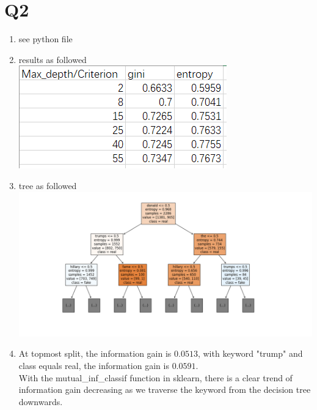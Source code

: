 \documentclass[12pt]{article}
\begin{document}
	
	\section*{Q2}
	\begin{enumerate}[label=\alph*)]
		\item see python file
		\item results as followed\\ \includegraphics[scale=0.7]{q2b}
		\item tree as followed\\ \includegraphics[scale=0.5]{q2c}
		\item At topmost split, the information gain is $0.0513$, with keyword "trump" and class equals real, the information gain is $0.0591$.\\
		With the mutual\_inf\_classif function in sklearn, there is a clear trend of information gain decreasing as we traverse the keyword from the decision tree downwards.
	\end{enumerate}
	
	
\end{document}

